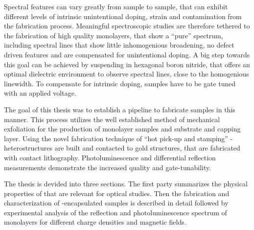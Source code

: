 Spectral features can vary greatly from sample to sample, that can exhibit different levels of intrinsic unintentional doping, strain and contamination from the fabrication process. Meaningful spectroscopic studies are therefore tethered to the fabrication of high quality monolayers, that show a ``pure'' spectrum, including spectral lines that show little inhomogenious broadening, no defect driven features and are compensated for unintentional doping. A big step towards this goal can be achieved by suspending \tmds in hexagonal boron nitride, that offers an optimal dielectric environment to observe spectral lines, close to the homogenious linewidth. To compensate for intrinsic doping, samples have to be gate tuned with an applied voltage.

The goal of this thesis was to establish a pipeline to fabricate samples in this manner. This process utilizes the well established method of mechanical exfoliation for the production of \tmdg monolayer samples and \hbn substrate and capping layer. Using the novel fabrication technique of ``hot pick-up and stamping'' \hbn-\tmdg heterostructures are built and contacted to gold structures, that are fabricated with contact lithography. Photoluminescence and differential reflection measurements demonstrate the increased quality and gate-tunability.

The thesis is devided into three sections. The first party summarizes the physical properties of \tmds that are relevant for optical studies. Then the fabrication and characterization of \hbn-encapsulated samples is described in detail followed by experimental analysis of the reflection and photoluminescence spectrum of \wse monolayers for different charge densities and magnetic fields.




